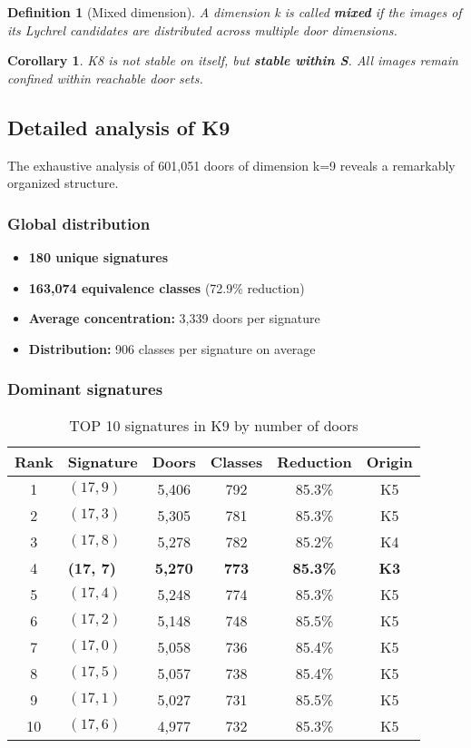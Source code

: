 \documentclass[12pt,a4paper]{article}
\newtheorem{definition}{Definition}[section]
\newtheorem{corollary}{Corollary}[section]
\theoremstyle{remark}
\begin{document}
\begin{definition}[Mixed dimension]
A dimension k is called \textbf{mixed} if the images of its Lychrel candidates are distributed across multiple door dimensions.
\end{definition}

\begin{corollary}
K8 is not stable on itself, but \textbf{stable within S}. All images remain confined within reachable door sets.
\end{corollary}

\subsection{Detailed analysis of K9}

The exhaustive analysis of 601,051 doors of dimension k=9 reveals a remarkably organized structure.

\subsubsection{Global distribution}

\begin{itemize}
\item \textbf{180 unique signatures}
\item \textbf{163,074 equivalence classes} (72.9\% reduction)
\item \textbf{Average concentration:} 3,339 doors per signature
\item \textbf{Distribution:} 906 classes per signature on average
\end{itemize}

\subsubsection{Dominant signatures}

\begin{table}[h]
\centering
\caption{TOP 10 signatures in K9 by number of doors}
\label{tab:top10k9}
\begin{tabular}{clcccc}
\toprule
\textbf{Rank} & \textbf{Signature} & \textbf{Doors} & \textbf{Classes} & \textbf{Reduction} & \textbf{Origin}\\
\midrule
1 & $(17, 9)$ & 5,406 & 792 & 85.3\% & K5\\
2 & $(17, 3)$ & 5,305 & 781 & 85.3\% & K5\\
3 & $(17, 8)$ & 5,278 & 782 & 85.2\% & K4\\
4 & \textbf{(17, 7)} & \textbf{5,270} & \textbf{773} & \textbf{85.3\%} & \textbf{K3}\\
5 & $(17, 4)$ & 5,248 & 774 & 85.3\% & K5\\
6 & $(17, 2)$ & 5,148 & 748 & 85.5\% & K5\\
7 & $(17, 0)$ & 5,058 & 736 & 85.4\% & K5\\
8 & $(17, 5)$ & 5,057 & 738 & 85.4\% & K5\\
9 & $(17, 1)$ & 5,027 & 731 & 85.5\% & K5\\
10 & $(17, 6)$ & 4,977 & 732 & 85.3\% & K5\\
\bottomrule
\end{tabular}
\end{table}
\end{document}

